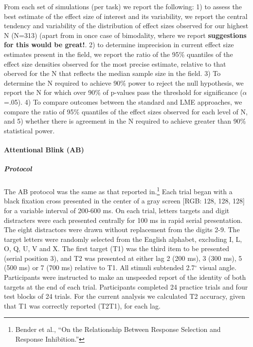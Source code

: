 \documentclass[
  12pt,
]{article}
\begin{document}
From each set of simulations (per task) we report the following: 1) to assess the best estimate of the effect size of interest and its variability, we report the central tendency and variability of the distribution of effect sizes observed for our highest N (N=313) (apart from in once case of bimodality, where we report \textbf{suggestions for this would be great!}. 2) to determine imprecision in current effect size estimates present in the field, we report the ratio of the 95\% quantiles of the effect size densities observed for the most precise estimate, relative to that oberved for the N that reflects the median sample size in the field. 3) To determine the N required to achieve 90\% power to reject the null hypothesis, we report the N for which over 90\% of p-values pass the threshold for significance (\(\alpha\)=.05). 4) To compare outcomes between the standard and LME approaches, we compare the ratio of 95\% quantiles of the effect sizes observed for each level of N, and 5) whether there is agreement in the N required to achieve greater than 90\% statistical power.

\hypertarget{attentional-blink-ab}{%
\paragraph{Attentional Blink (AB)}\label{attentional-blink-ab}}

\hypertarget{protocol}{%
\subparagraph{Protocol}\label{protocol}}

The AB protocol was the same as that reported in.\footnote{Bender et al., ``On the Relationship Between Response Selection and Response Inhibition.''} Each trial began with a black fixation cross presented in the center of a gray screen {[}RGB: 128, 128, 128{]} for a variable interval of 200-600 ms. On each trial, letters targets and digit distracters were each presented centrally for 100 ms in rapid serial presentation. The eight distractors were drawn without replacement from the digits 2-9. The target letters were randomly selected from the English alphabet, excluding I, L, O, Q, U, V and X. The first target (T1) was the third item to be presented (serial position 3), and T2 was presented at either lag 2 (200 ms), 3 (300 ms), 5 (500 ms) or 7 (700 ms) relative to T1. All stimuli subtended 2.7\(^\circ\) visual angle. Participants were instructed to make an unspeeded report of the identity of both targets at the end of each trial. Participants completed 24 practice trials and four test blocks of 24 trials. For the current analysis we calculated T2 accuracy, given that T1 was correctly reported (T2\textbar T1), for each lag.
\end{document}
